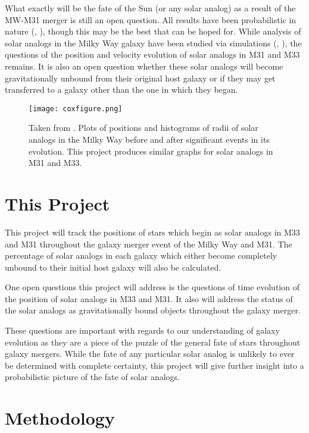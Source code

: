 \documentclass{aastex63}
\begin{document}
What exactly will be the fate of the Sun (or any solar analog) as a result of the MW-M31 merger is still an open question. All results have been probabilistic in nature (\cite{cox08}, \cite{van12}), though this may be the best that can be hoped for. While analysis of solar analogs in the Milky Way galaxy have been studied via simulations (\cite{cox08}, \cite{van12}), the questions of the position and velocity evolution of solar analogs in M31 and M33 remains. It is also an open question whether these solar analogs will become gravitationally unbound from their original host galaxy or if they may get transferred to a galaxy other than the one in which they began.

\begin{figure}
    \centering
    \texttt{[image: coxfigure.png]}
    \caption{Taken from \cite{cox08}. Plots of positions and histograms of radii of solar analogs in the Milky Way before and after significant events in its evolution. This project produces similar graphs for solar analogs in M31 and M33.}
    \label{coxfigure}
\end{figure}

\newpage

\section{This Project} \label{sec:proposal}

This project will track the positions of stars which begin as solar analogs in M33 and M31 throughout the galaxy merger event of the Milky Way and M31. The percentage of solar analogs in each galaxy which either become completely unbound to their initial host galaxy will also be calculated. 

One open questions this project will address is the questions of time evolution of the position of solar analogs in M33 and M31. It also will address the status of the solar analogs as gravitationally bound objects throughout the galaxy merger. 

These questions are important with regards to our understanding of galaxy evolution as they are a piece of the puzzle of the general fate of stars throughout galaxy mergers. While the fate of any particular solar analog is unlikely to ever be determined with complete certainty, this project will give further insight into a probabilistic picture of the fate of solar analogs.   

\section{Methodology}
\end{document}
